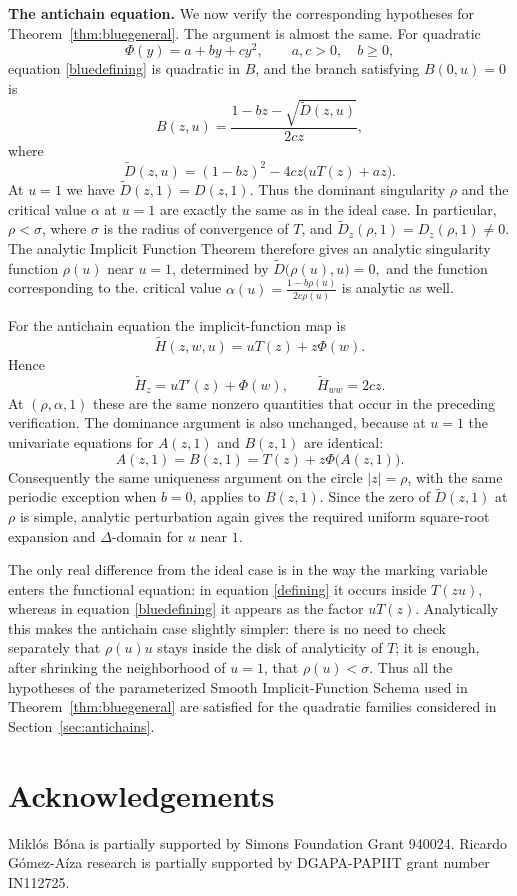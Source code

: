 \documentclass[10pt,a4paper]{amsart}
\theoremstyle{remark}
\begin{document}
\medskip
\noindent\textbf{The antichain equation.}
We now verify the corresponding hypotheses for
Theorem~\ref{thm:bluegeneral}.  The argument is almost the same.  For
quadratic
\[
\Phi(y)=a+by+cy^2,
\qquad a,c>0,\quad b\geq0,
\]
equation \eqref{bluedefining} is quadratic in $B$, and the branch satisfying
$B(0,u)=0$ is
\[
B(z,u)=\frac{1-bz-\sqrt{\widetilde D(z,u)}}{2cz},
\]
where
\[
\widetilde D(z,u)
=
(1-bz)^2-4cz\bigl(uT(z)+az\bigr).
\]
At $u=1$ we have
$
\widetilde D(z,1)=D(z,1).
$
Thus the dominant singularity $\rho$ and the critical value $\alpha$ at
$u=1$ are exactly the same as in the ideal case.  In particular,
$\rho<\sigma$, where $\sigma$ is the radius of convergence of $T$, and
$\widetilde D_z(\rho,1)=D_z(\rho,1)\neq0$.  The analytic Implicit Function
Theorem therefore gives an analytic singularity function $\rho(u)$ near
$u=1$, determined by
$
\widetilde D\big(\rho(u),u\big)=0,
$
and the function corresponding to the. critical value
$
\alpha(u)=\frac{1-b\rho(u)}{2c\rho(u)}
$
is analytic as well.

For the antichain equation the implicit-function map is
\[
\widetilde H(z,w,u)=uT(z)+z\Phi(w).
\]
Hence
\[
\widetilde H_z=uT'(z)+\Phi(w),
\qquad
\widetilde H_{ww}=2cz.
\]
At $(\rho,\alpha,1)$ these are the same nonzero quantities that occur in
the preceding verification.  The dominance argument is also unchanged,
because at $u=1$ the univariate equations for $A(z,1)$ and $B(z,1)$ are
identical:
\[
A(z,1)=B(z,1)=T(z)+z\Phi\bigl(A(z,1)\bigr).
\]
Consequently the same uniqueness argument on the circle $|z|=\rho$, with
the same periodic exception when $b=0$, applies to $B(z,1)$.  Since the
zero of $\widetilde D(z,1)$ at $\rho$ is simple, analytic perturbation again
gives the required uniform square-root expansion and $\Delta$-domain for
$u$ near $1$.

The only real difference from the ideal case is in the way the marking
variable enters the functional equation: in equation \eqref{defining} it occurs
inside $T(zu)$, whereas in equation \eqref{bluedefining} it appears as the factor
$uT(z)$.  Analytically this makes the antichain case slightly simpler:
there is no need to check separately that $\rho(u)u$ stays inside the disk
of analyticity of $T$; it is enough, after shrinking the neighborhood of
$u=1$, that $\rho(u)<\sigma$.  Thus all the hypotheses of the parameterized
Smooth Implicit-Function Schema used in
Theorem~\ref{thm:bluegeneral} are satisfied for the quadratic families
considered in Section~\ref{sec:antichains}.


\section*{Acknowledgements}
Mikl\'os B\'ona  is partially supported by Simons Foundation Grant 940024.
Ricardo Gómez-Aíza research is partially supported by DGAPA-PAPIIT grant number IN112725.
\end{document}
